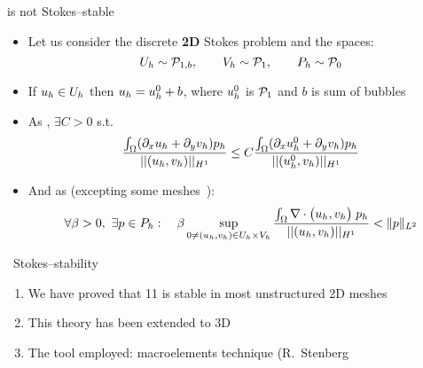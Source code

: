 \begin{frame}{ is not Stokes--stable}
  \begin{itemize}\itemsep0.66em
  \item Let us consider the discrete \textbf{2D} Stokes problem and
    the spaces:
    \begin{equation*}
      \Uh \sim \P{1,b}, \qquad
      \Vh \sim \P1, \qquad
      \Ph \sim \P0
    \end{equation*}
  \item
    If $\uh\in\Uh$ then $\uh=\uh^0+b$, where $\uh^0$ is $\P1$ and
    $b$ is sum of bubbles
  \item As , $\exists C>0$ s.t.
    \begin{equation*}
      \label{eq:b10.not.stability}
      \frac{\int_\Omega(\divx\uh+\dy\vh)\ph}{||(\uh,\vh)||_{H^1}}
      \le C
      \frac{\int_\Omega(\divx\uh^0+\dy\vh)\ph}{||(\uh^0,\vh)||_{H^1}}
    \end{equation*}
  \item And as 
    (excepting some meshes~):
    \begin{equation*}
      \forall\beta>0,\ \exists\pp\in\Ph:\quad
      \beta\sup_{0\neq(\uh,\vh)\in\Uh\times\Vh}
      \frac{\int_\Omega \div\big(\uh,\vh\big)\;
        \ph}{||(\uh,\vh)||_{H^1}} < \norm[L^2]\pp
    \end{equation*}
  \end{itemize}
\end{frame}


\begin{frame}{
    \ Stokes--stability}
  \begin{enumerate}\itemsep0.66em
  \item We have proved that 11 is stable in most
    unstructured 2D meshes
  \item This theory has been extended to 3D
  \item The tool employed: macroelements technique (R.~Stenberg~\cite{Stenberg:84,Stenberg:90}
  \end{enumerate}
\end{frame}


